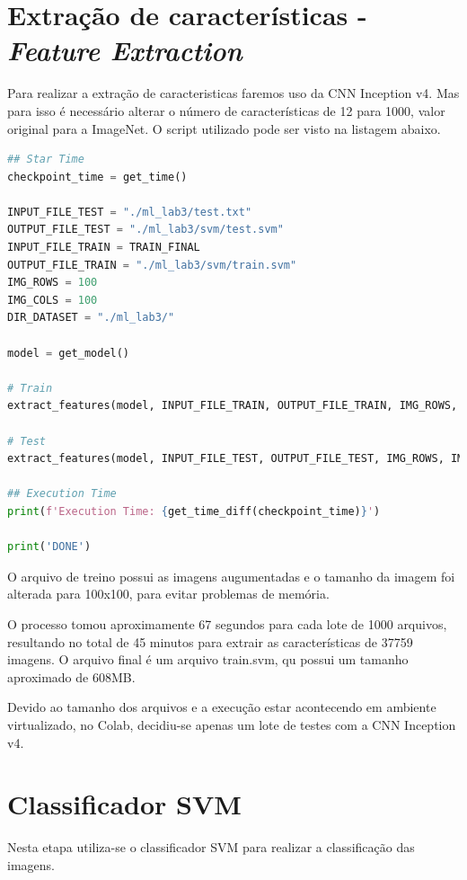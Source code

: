 \documentclass[12pt,
	english,			%
	french,				%
	spanish,			%
	brazil,				%
	]{article}
\begin{document}
\section{Extração de características - \textit{Feature Extraction}}

Para realizar a extração de caracteristicas faremos uso da CNN Inception v4. Mas para isso é necessário alterar o número de características de 12 para 1000, valor original para a ImageNet. O script utilizado pode ser visto na listagem abaixo.

\begin{lstlisting}[caption={CNN escolhida},captionpos=b,frame=single,label={code:modelo_personalizado}, language=Python]
## Star Time
checkpoint_time = get_time()

INPUT_FILE_TEST = "./ml_lab3/test.txt"
OUTPUT_FILE_TEST = "./ml_lab3/svm/test.svm"
INPUT_FILE_TRAIN = TRAIN_FINAL
OUTPUT_FILE_TRAIN = "./ml_lab3/svm/train.svm"
IMG_ROWS = 100
IMG_COLS = 100
DIR_DATASET = "./ml_lab3/"

model = get_model()

# Train
extract_features(model, INPUT_FILE_TRAIN, OUTPUT_FILE_TRAIN, IMG_ROWS, IMG_COLS, DIR_DATASET)

# Test
extract_features(model, INPUT_FILE_TEST, OUTPUT_FILE_TEST, IMG_ROWS, IMG_COLS, DIR_DATASET)

## Execution Time
print(f'Execution Time: {get_time_diff(checkpoint_time)}')

print('DONE')
\end{lstlisting}

O arquivo de treino possui as imagens augumentadas e o tamanho da imagem foi alterada para 100x100, para evitar problemas de memória.

O processo tomou aproximamente 67 segundos para cada lote de 1000 arquivos, resultando no total de 45 minutos para extrair as características de 37759 imagens. O arquivo final é um arquivo train.svm, qu possui um tamanho aproximado de 608MB.

Devido ao tamanho dos arquivos e a execução estar acontecendo em ambiente virtualizado, no Colab, decidiu-se apenas um lote de testes com a CNN Inception v4.

\section{Classificador SVM}

Nesta etapa utiliza-se o classificador SVM para realizar a classificação das imagens.
\end{document}
